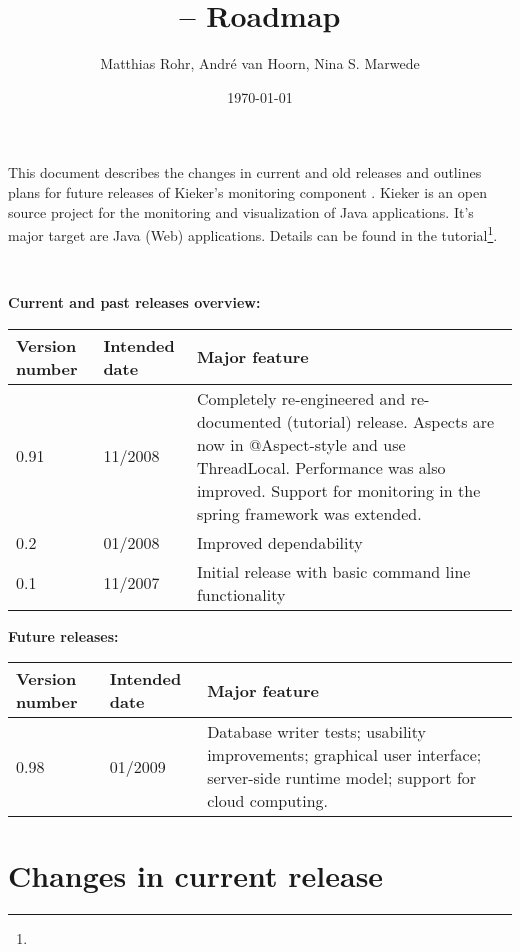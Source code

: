 \documentclass{scrartcl}
\title{\kieker -- Roadmap}
\date{\today \\ \kiekerurl{roadmap.pdf}}
\author{Matthias Rohr, Andr\'{e} van Hoorn, Nina S. Marwede}
\begin{document}
\maketitle
\noindent
This document describes the changes in current and old releases and outlines plans for future releases of Kieker's monitoring component \tpmon{}. Kieker is an open source project
for the monitoring and visualization of Java applications. It's major target are Java (Web) applications. Details can be found in the tutorial\footnote{\kiekertutorialurl}.

\

\noindent \large{\textbf{Current and past releases overview:}}
\begin{center}%
 \begin{tabular}{|l|l|p{8cm}|} \hline
\textbf{Version number} & \textbf{Intended date} & \textbf{Major feature} \\ \hline
0.91 & 11/2008 & Completely re-engineered and re-documented (tutorial) release. Aspects are now in @Aspect-style and use ThreadLocal. Performance was also improved. Support for monitoring in the spring framework was extended.\\ \hline
0.2 & 01/2008 & Improved dependability \\ \hline
0.1 & 11/2007 & Initial release with basic command line functionality \\ \hline
\end{tabular}
\end{center}

\noindent \large{\textbf{Future releases:}}
\begin{center}%
 \begin{tabular}{|l|l|p{8cm}|} \hline
\textbf{Version number} & \textbf{Intended date} & \textbf{Major feature} \\ \hline
0.98 & 01/2009 & Database writer tests; usability improvements; graphical user interface; server-side runtime model; support for cloud computing.\\ \hline
\end{tabular}
\end{center}


\section{Changes in current release}
\end{document}

